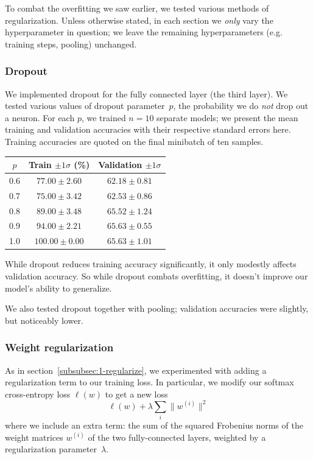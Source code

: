 \documentclass{article}
\newcommand{\sind}[1]{^{(#1)}}
\begin{document}
\begin{multicols}{2}
To combat the overfitting we saw earlier,
we tested various methods of regularization.
Unless otherwise stated,
in each section we \emph{only} vary the hyperparameter in question;
we leave the remaining hyperparameters (e.g. training steps, pooling) unchanged.


\subsubsection{Dropout}


We implemented dropout for the fully connected layer (the third layer).
We tested various values of dropout parameter~$p$,
the probability we do \emph{not} drop out a neuron.
For each $p$, we trained $n=10$ separate models;
we present the mean training and validation accuracies
with their respective standard errors here.
Training accuracies are quoted on the final minibatch of ten samples.
\begin{center}
    \begin{tabular}{c|cc}
        $p$ & Train $\pm 1 \sigma$ (\%) & Validation $\pm 1 \sigma$\\\hline
        0.6 &  $77.00 \pm 2.60$ & $62.18 \pm 0.81$ \\
        0.7 &  $75.00 \pm 3.42$ & $62.53 \pm 0.86$ \\
        0.8 &  $89.00 \pm 3.48$ & $65.52 \pm 1.24$ \\
        0.9 &  $94.00 \pm 2.21$ & $65.63 \pm 0.55$ \\
        1.0 & $100.00 \pm 0.00$ & $65.63 \pm 1.01$ \\
    \end{tabular}
\end{center}

While dropout reduces training accuracy significantly,
it only modestly affects validation accuracy.
So while dropout combats overfitting,
it doesn't improve our model's ability to generalize.

We also tested dropout together with pooling;
validation accuracies were slightly, but noticeably lower.


\subsubsection{Weight regularization}

As in section~\ref{subsubsec:1-regularize},
we experimented with adding a regularization term
to our training loss.
In particular, we modify our softmax cross-entropy loss $\ell(w)$
to get a new loss
\begin{equation}
    \ell(w) + \lambda\sum_i \lVert w\sind{i} \rVert^2
\end{equation}
where we include an extra term:
the sum of the squared Frobenius norms of the weight matrices $w\sind{i}$
of the two fully-connected layers,
weighted by a regularization parameter~$\lambda$.


\end{multicols}
\end{document}
